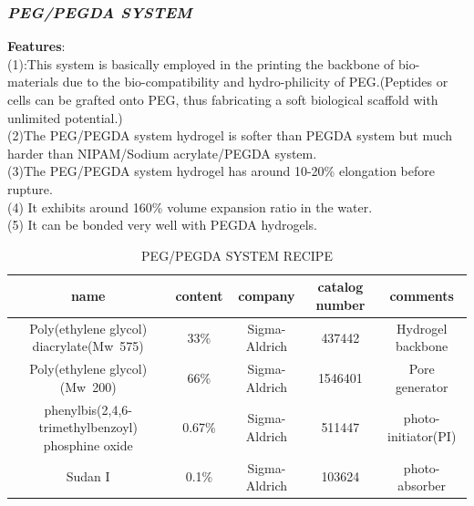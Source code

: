 \documentclass[a4paper]{article}
\begin{document}
\begin{itemize}
  \subsubsection{\textit{PEG/PEGDA SYSTEM}}
  \textbf{Features}:\\
  (1):This system is basically employed in the printing the backbone of bio-materials due to the bio-compatibility and 
  hydro-philicity of PEG.(Peptides or cells can be grafted onto PEG, thus fabricating a soft biological scaffold with 
  unlimited potential.)\\
  (2)The PEG/PEGDA system hydrogel is softer than PEGDA system but much harder than NIPAM/Sodium acrylate/PEGDA system.\\
  (3)The PEG/PEGDA system hydrogel has around 10-20\% elongation before rupture.\\
  (4) It exhibits around 160\% volume expansion ratio in the water.\\
  (5) It can be bonded very well with PEGDA hydrogels.
  \begin{table}
    \begin{center}
      \begin{tabular}{ | c | c | c | c | c |}
        \hline
        \textbf{name}&\textbf{content}&\textbf{company}&\textbf{catalog number}&\textbf{comments} \\ 
        \hline
        Poly(ethylene glycol) diacrylate(Mw~575)&33\%&Sigma-Aldrich&437442&Hydrogel backbone \\     
        \hline
        Poly(ethylene glycol)(Mw~200)&66\%&Sigma-Aldrich&1546401&Pore generator \\      
        \hline
        phenylbis(2,4,6-trimethylbenzoyl) phosphine oxide&0.67\%&Sigma-Aldrich&511447&photo-initiator(PI) \\
        \hline
        Sudan I&0.1\%&Sigma-Aldrich&103624&photo-absorber \\
        \hline
      \end{tabular}
      \caption{PEG/PEGDA SYSTEM RECIPE}
    \end{center}
  \end{table}

\end{itemize}
\end{document}
